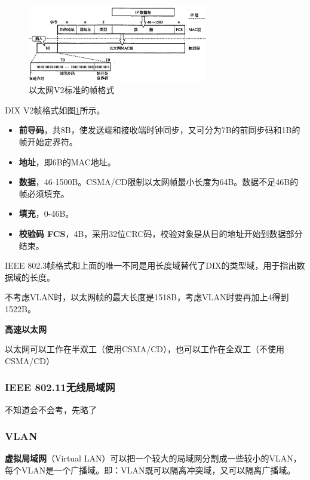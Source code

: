 \documentclass[12pt, a4paper, oneside]{ctexart}
\begin{document}
\begin{enumerate}
    \begin{figure}[h]
        \centering
        \includegraphics[width=0.7\textwidth]{./images/ethernet-v2-frame.png}
        \caption{以太网V2标准的帧格式}
        \label{ethernet-v2-frame}
    \end{figure}

    DIX V2帧格式如图\ref{ethernet-v2-frame}所示。
    \begin{itemize}
        \item {\bf 前导码}，共8B，使发送端和接收端时钟同步，又可分为7B的前同步码和1B的帧开始定界符。
        \item {\bf 地址}，即6B的MAC地址。
        \item {\bf 数据}，46-1500B。CSMA/CD限制以太网帧最小长度为64B。数据不足46B的帧必须填充。
        \item {\bf 填充}，0-46B。
        \item {\bf 校验码 FCS}，4B，采用32位CRC码，校验对象是从目的地址开始到数据部分结束。
    \end{itemize}

    IEEE 802.3帧格式和上面的唯一不同是用长度域替代了DIX的类型域，用于指出数据域的长度。

    不考虑VLAN时，以太网帧的最大长度是1518B，考虑VLAN时要再加上4得到1522B。

    {\bf 高速以太网}

    以太网可以工作在半双工（使用CSMA/CD），也可以工作在全双工（不使用CSMA/CD）
\end{enumerate}

\subsubsection{IEEE 802.11无线局域网}

不知道会不会考，先略了

\subsubsection{VLAN}

\textbf{虚拟局域网}（Virtual LAN）可以把一个较大的局域网分割成一些较小的VLAN，每个VLAN是一个广播域。即：VLAN既可以隔离冲突域，又可以隔离广播域。
\end{document}
